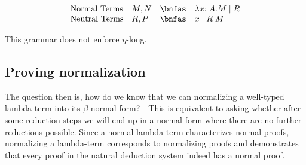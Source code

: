 \documentclass{article}
\newcommand{\nf}[2]{#1 : #2 ~\mathsf{nf}}
\newcommand{\neu}[2]{#1 : #2 ~\mathsf{ne}}
\begin{document}
\[
\begin{array}{llcl}
\mbox{Normal Terms}  & M,N & \bnfas & \lambda x{:A}. M \mid R \\
\mbox{Neutral Terms} & R, P & \bnfas & x \mid R\;M \\
  \end{array}
\]

This grammar does not enforce $\eta$-long.






\subsection*{Proving normalization}
The question then is, how do we know that we can normalizing a well-typed lambda-term into its $\beta$ normal form? - This is equivalent to asking whether after some reduction steps we will end up in a normal form where there are no further reductions possible. Since a normal lambda-term characterizes normal proofs, normalizing a lambda-term corresponds to normalizing proofs and demonstrates that every proof in the natural deduction system indeed has a normal proof. %
\end{document}
